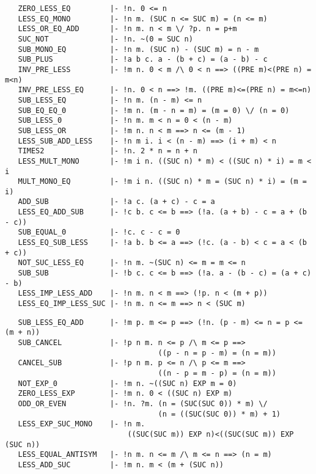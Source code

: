 \begin{hol}\begin{verbatim}
   ZERO_LESS_EQ         |- !n. 0 <= n
   LESS_EQ_MONO         |- !n m. (SUC n <= SUC m) = (n <= m)
   LESS_OR_EQ_ADD       |- !n m. n < m \/ ?p. n = p+m
   SUC_NOT              |- !n. ~(0 = SUC n)
   SUB_MONO_EQ          |- !n m. (SUC n) - (SUC m) = n - m
   SUB_PLUS             |- !a b c. a - (b + c) = (a - b) - c
   INV_PRE_LESS         |- !m n. 0 < m /\ 0 < n ==> ((PRE m)<(PRE n) = m<n)
   INV_PRE_LESS_EQ      |- !n. 0 < n ==> !m. ((PRE m)<=(PRE n) = m<=n)
   SUB_LESS_EQ          |- !n m. (n - m) <= n
   SUB_EQ_EQ_0          |- !m n. (m - n = m) = (m = 0) \/ (n = 0)
   SUB_LESS_0           |- !n m. m < n = 0 < (n - m)
   SUB_LESS_OR          |- !m n. n < m ==> n <= (m - 1)
   LESS_SUB_ADD_LESS    |- !n m i. i < (n - m) ==> (i + m) < n
   TIMES2               |- !n. 2 * n = n + n
   LESS_MULT_MONO       |- !m i n. ((SUC n) * m) < ((SUC n) * i) = m < i
   MULT_MONO_EQ         |- !m i n. ((SUC n) * m = (SUC n) * i) = (m = i)
   ADD_SUB              |- !a c. (a + c) - c = a
   LESS_EQ_ADD_SUB      |- !c b. c <= b ==> (!a. (a + b) - c = a + (b - c))
   SUB_EQUAL_0          |- !c. c - c = 0
   LESS_EQ_SUB_LESS     |- !a b. b <= a ==> (!c. (a - b) < c = a < (b + c))
   NOT_SUC_LESS_EQ      |- !n m. ~(SUC n) <= m = m <= n
   SUB_SUB              |- !b c. c <= b ==> (!a. a - (b - c) = (a + c) - b)
   LESS_IMP_LESS_ADD    |- !n m. n < m ==> (!p. n < (m + p))
   LESS_EQ_IMP_LESS_SUC |- !n m. n <= m ==> n < (SUC m)
\end{verbatim}\end{hol}
\begin{hol}\begin{verbatim}
   SUB_LESS_EQ_ADD      |- !m p. m <= p ==> (!n. (p - m) <= n = p <= (m + n))
   SUB_CANCEL           |- !p n m. n <= p /\ m <= p ==>
                                   ((p - n = p - m) = (n = m))
   CANCEL_SUB           |- !p n m. p <= n /\ p <= m ==>
                                   ((n - p = m - p) = (n = m))
   NOT_EXP_0            |- !m n. ~((SUC n) EXP m = 0)
   ZERO_LESS_EXP        |- !m n. 0 < ((SUC n) EXP m)
   ODD_OR_EVEN          |- !n. ?m. (n = (SUC(SUC 0)) * m) \/
                                   (n = ((SUC(SUC 0)) * m) + 1)
   LESS_EXP_SUC_MONO    |- !n m.
                            ((SUC(SUC m)) EXP n)<((SUC(SUC m)) EXP (SUC n))
   LESS_EQUAL_ANTISYM   |- !n m. n <= m /\ m <= n ==> (n = m)
   LESS_ADD_SUC         |- !m n. m < (m + (SUC n))

\end{verbatim}\end{hol}


